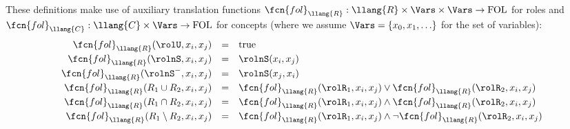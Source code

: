 These definitions make use of auxiliary translation functions $ \fcn{fol}_ \llang{R}:  \llang{R} \times \Vars \times \Vars \to \mathrm{FOL}$ for roles and $ \fcn{fol}_ \llang{C}:  \llang{C} \times \Vars \to \mathrm{FOL}$ for concepts (where we assume $\Vars=\{x_0,x_1,\ldots\}$ for the set of variables):
\[
\begin{array}{rll}
	 \fcn{fol}_{ \llang{R}}(\rolU,x_i,x_j) & = & \mathrm{true} \\[1mm]
	 \fcn{fol}_{ \llang{R}}(\rolnS,x_i,x_j) & = & \rolnS(x_i,x_j) \\[1mm]
	 \fcn{fol}_{ \llang{R}}(\rolnS^-,x_i,x_j) & = & \rolnS(x_j,x_i) \\[1mm]
	 \fcn{fol}_{ \llang{R}}(R_1 \cup R_2,x_i,x_j) & = & \fcn{fol}_{ \llang{R}}(\rolR_1,x_i,x_j) \vee \fcn{fol}_{ \llang{R}}(\rolR_2,x_i,x_j) \\[1mm]
	 \fcn{fol}_{ \llang{R}}(R_1 \cap R_2,x_i,x_j) & = & \fcn{fol}_{ \llang{R}}(\rolR_1,x_i,x_j) \wedge \fcn{fol}_{ \llang{R}}(\rolR_2,x_i,x_j) \\[1mm]
	 \fcn{fol}_{ \llang{R}}(R_1 \setminus R_2,x_i,x_j) & = & \fcn{fol}_{ \llang{R}}(\rolR_1,x_i,x_j) \wedge \neg\fcn{fol}_{ \llang{R}}(\rolR_2,x_i,x_j)
\end{array}
\]
